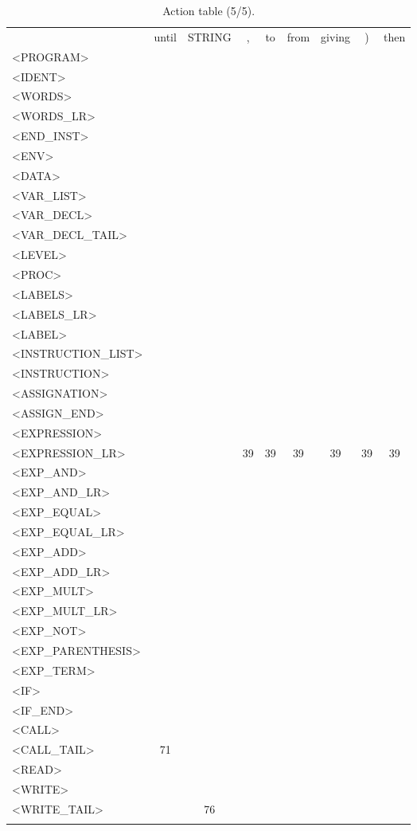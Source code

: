 \documentclass[a4paper,11pt]{article}
\begin{document}
\newpage
\begin{longtable}{l||cccccccc}
	& until & STRING & , & to & from & giving & ) & then \\
	<PROGRAM> & & & & & & & & \\
	<IDENT> & & & & & & & & \\
	<WORDS>  & & & & & & & & \\
	<WORDS\_LR>  & & & & & & & & \\
	<END\_INST> & & & & & & & & \\
	<ENV> & & & & & & & & \\
	<DATA>  & & & & & & & & \\
	<VAR\_LIST> & & & & & & & & \\
	<VAR\_DECL>  & & & & & & & & \\
	<VAR\_DECL\_TAIL> & & & & & & & & \\
	<LEVEL> & & & & & & & & \\
	<PROC> & & & & & & & & \\
	<LABELS> & & & & & & & & \\
	<LABELS\_LR>  & & & & & & & & \\
	<LABEL>  & & & & & & & & \\
	<INSTRUCTION\_LIST> & & & & & & & & \\
	<INSTRUCTION> & & & & & & & & \\
	<ASSIGNATION> & & & & & & & & \\
	<ASSIGN\_END> & & & & & & & & \\
	<EXPRESSION>  & & & & & & & & \\
	<EXPRESSION\_LR> & & & 39 & 39 & 39 & 39 & 39 & 39 \\
	<EXP\_AND>  & & & & & & & & \\
	<EXP\_AND\_LR> & & & & & & & & \\
	<EXP\_EQUAL>  & & & & & & & & \\
	<EXP\_EQUAL\_LR> & & & & & & & & \\
	<EXP\_ADD>  & & & & & & & & \\
	<EXP\_ADD\_LR> & & & & & & & & \\
	<EXP\_MULT>  & & & & & & & & \\
	<EXP\_MULT\_LR> & & & & & & & & \\
	<EXP\_NOT>  & & & & & & & & \\
	<EXP\_PARENTHESIS>  & & & & & & & & \\
	<EXP\_TERM>  & & & & & & & & \\
	<IF>  & & & & & & & & \\
	<IF\_END>  & & & & & & & & \\
	<CALL>  & & & & & & & & \\
	<CALL\_TAIL> & 71 & & & & & & & \\
	<READ>  & & & & & & & & \\
	<WRITE> & & & & & & & & \\
	<WRITE\_TAIL> & & 76 & & & & & & \\
	\caption{Action table (5/5).}
\end{longtable}
\end{document}
